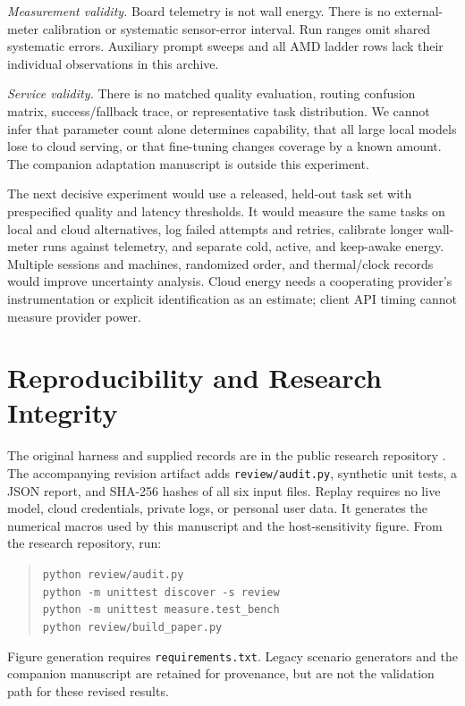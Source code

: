 \documentclass[conference]{IEEEtran}
\begin{document}
\emph{Measurement validity.} Board telemetry is not wall energy.
There is no external-meter calibration or systematic sensor-error interval.
Run ranges omit shared systematic errors. Auxiliary prompt sweeps and
all AMD ladder rows lack their individual observations in this archive.

\emph{Service validity.} There is no matched quality evaluation, routing
confusion matrix, success/fallback trace, or representative task distribution.
We cannot infer that parameter count alone determines capability, that all
large local models lose to cloud serving, or that fine-tuning changes
coverage by a known amount. The companion adaptation manuscript is
outside this experiment.

The next decisive experiment would use a released, held-out task set with
prespecified quality and latency thresholds. It would measure the same
tasks on local and cloud alternatives, log failed attempts and retries,
calibrate longer wall-meter runs against telemetry, and separate cold,
active, and keep-awake energy. Multiple sessions and machines, randomized
order, and thermal/clock records would improve uncertainty analysis.
Cloud energy needs a cooperating provider's instrumentation or explicit
identification as an estimate; client API timing cannot measure provider
power.

\section{Reproducibility and Research Integrity}
The original harness and supplied records are in the public research
repository \cite{autoyou2026measure}. The accompanying revision artifact
adds \texttt{review/audit.py}, synthetic unit tests, a JSON report, and
SHA-256 hashes of all six input files.
Replay requires no live model, cloud credentials, private logs, or personal
user data. It generates the numerical macros used by this manuscript and
the host-sensitivity figure. From the research repository, run:
\begin{quote}\small
\texttt{python review/audit.py}\\
\texttt{python -m unittest discover -s review}\\
\texttt{python -m unittest measure.test\_bench}\\
\texttt{python review/build\_paper.py}
\end{quote}
Figure generation requires \texttt{requirements.txt}.
Legacy scenario generators and the companion manuscript are retained for
provenance, but are not the validation path for these revised results.
\end{document}
